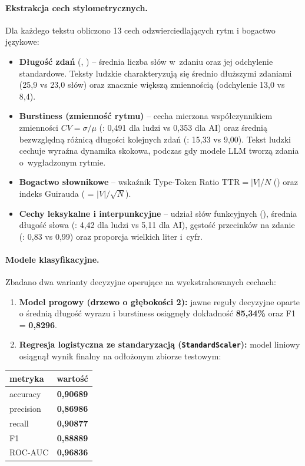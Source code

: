 \paragraph{Ekstrakcja cech stylometrycznych.}
Dla każdego tekstu obliczono 13 cech odzwierciedlających rytm i bogactwo językowe:
\begin{itemize}
	\item \textbf{Długość zdań} (, ) --
	średnia liczba słów w~zdaniu oraz jej odchylenie standardowe. Teksty ludzkie charakteryzują się średnio dłuższymi zdaniami (25,9 vs 23,0 słów) oraz znacznie większą zmiennością (odchylenie 13,0 vs 8,4).
	\item \textbf{Burstiness (zmienność rytmu)} --
	cecha mierzona współczynnikiem zmienności $CV = \sigma / \mu$ (: 0,491 dla ludzi vs 0,353 dla AI) oraz średnią bezwzględną różnicą długości kolejnych zdań (: 15,33 vs 9,00). Tekst ludzki cechuje wyraźna dynamika skokowa, podczas gdy modele LLM tworzą zdania o~wygładzonym rytmie.
	\item \textbf{Bogactwo słownikowe} --
	wskaźnik Type-Token Ratio $\text{TTR} = |V| / N$ () oraz indeks Guirauda ( = $|V| / \sqrt{N}$).
	\item \textbf{Cechy leksykalne i interpunkcyjne} --
	udział słów funkcyjnych (), średnia długość słowa (: 4,42 dla ludzi vs 5,11 dla AI), gęstość przecinków na zdanie (: 0,83 vs 0,99) oraz proporcja wielkich liter i~cyfr.
\end{itemize}

\paragraph{Modele klasyfikacyjne.}
Zbadano dwa warianty decyzyjne operujące na wyekstrahowanych cechach:
\begin{enumerate}
	\item \textbf{Model progowy (drzewo o głębokości 2):} jawne reguły decyzyjne oparte o średnią długość wyrazu i burstiness osiągnęły dokładność \textbf{85,34\%} oraz F1 = \textbf{0,8296}.
	\item \textbf{Regresja logistyczna ze standaryzacją (\texttt{StandardScaler}):} model liniowy osiągnął wynik finalny na odłożonym zbiorze testowym:
\end{enumerate}

\begin{center}
\begin{tabular}{|l|c|}
\hline
metryka & wartość \\
\hline
accuracy & \textbf{0,90689} \\
precision & \textbf{0,86986} \\
recall & \textbf{0,90877} \\
F1 & \textbf{0,88889} \\
ROC-AUC & \textbf{0,96836} \\
\hline
\end{tabular}
\end{center}

